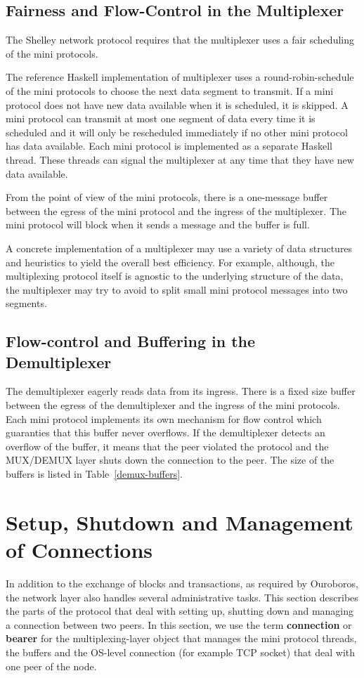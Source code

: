 \documentclass{report}
\theoremstyle{definition}{
  \newtheorem{lemma}{Lemma}[section] %
  \newtheorem{definition}[lemma]{Definition}
}
\theoremstyle{theorem}{
  \newtheorem{invariant}[lemma]{Invariant}
  \newtheorem{proofobligation}[lemma]{Proof Obligation}
}
\numberwithin{equation}{lemma}
\begin{document}
\subsection{Fairness and Flow-Control in the Multiplexer}
The Shelley network protocol requires that the multiplexer uses a fair scheduling of the mini protocols.

The reference Haskell implementation of multiplexer uses a round-robin-schedule of the mini protocols
to choose the next data segment to transmit.
If a mini protocol does not have new data available when it is scheduled, it is skipped.
A mini protocol can transmit at most one segment of data every time it is scheduled
and it will only be rescheduled immediately if no other mini protocol has data available.
Each mini protocol is implemented as a separate Haskell thread.
These threads can signal the multiplexer at any time that they have new data available.

From the point of view of the mini protocols, there is a one-message buffer between the egress of
the mini protocol and the ingress of the multiplexer.
The mini protocol will block when it sends a message and the buffer is full.

A concrete implementation of a multiplexer may use a variety of data structures and heuristics to
yield the overall best efficiency.
For example, although, the multiplexing protocol itself is agnostic to the underlying structure of
the data, the multiplexer may try to avoid to split small mini protocol messages into two segments.

\subsection{Flow-control and Buffering in the Demultiplexer}
The demultiplexer eagerly reads data from its ingress.
There is a fixed size buffer between the egress of the demultiplexer and the ingress of
the mini protocols.
Each mini protocol implements its own mechanism for flow control which guaranties that this buffer
never overflows.
If the demultiplexer detects an overflow of the buffer, it means that the peer violated the
protocol and the MUX/DEMUX layer shuts down the connection to the peer.
The size of the buffers is listed in Table~\ref{demux-buffers}.

\section{Setup, Shutdown and Management of Connections}
\label{peer-setup-section}
In addition to the exchange of blocks and transactions, as required by Ouroboros,
the network layer also handles several administrative tasks.
This section describes the parts of the protocol that deal with setting up, shutting down and
managing a connection between two peers.
In this section, we use the term {\bf connection} or {\bf bearer} for the multiplexing-layer object
that manages the mini protocol threads, the buffers and the OS-level connection
(for example TCP socket) that deal with one peer of the node.
\end{document}
